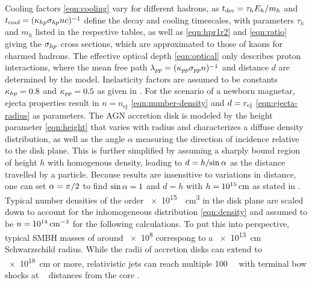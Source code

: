 Cooling factors \eqref{eqn:cooling} vary for different hadrons, as $t_\text{dec} \kern-0.5pt = \tau_h E_h / m_h$ and
$t_\text{cool} \kern-0.5pt = \cramped{(\kappa_{h \kern-0.1pt p} \sigma_{h \kern-0.1pt p} n c)^{-1}}$ define the decay and cooling timescales,
with parameters $\tau_h$ and $m_h$ listed in the respective tables, as well as \eqref{eqn:hpr1r2} and \eqref{eqn:ratio} giving the
$\sigma_{h \kern-0.1pt p}$ cross sections, which are approximated to those of kaons for charmed hadrons. The effective optical depth
\eqref{eqn:optical} only describes proton interactions, where the mean free path
$\lambda_{p \kern-0.1pt p} = \cramped{(\kappa_{p \kern-0.1pt p} \sigma_{p \kern-0.1pt p} n)^{-1}}$ and distance $d$ are determined by the
model. Inelasticity factors are assumed to be constants $\kappa_{h \kern-0.1pt p} = \num{0.8}$ and $\kappa_{p \kern-0.1pt p} = \num{0.5}$
as given in \cite{Carpio_2020}. For the scenario of a newborn magnetar, ejecta properties result in
$n = n_\text{ej}$ \eqref{eqn:number-density} and $d \kern+0.1pt = r_\text{ej}$ \eqref{eqn:ejecta-radius} as parameters. The AGN
accretion disk is modeled by the height parameter \eqref{eqn:height} that varies with radius and characterizes a diffuse density
distribution, as well as the angle $\alpha$ measuring the direction of incidence relative to the disk plane. This is further
simplified by assuming a sharply bound region of height $h$ with homogenous density, leading to $d = h / \kern-2.0pt \sin \alpha$
as the distance travelled by a particle. Because results are insensitive to variations in distance, one can set
$\alpha = \pi \kern+0.25pt / 2$ to find $\sin\alpha = \kern-0.1pt 1$ and $d = h$ with $h = \kern-0.5pt \smash{\qty{e15}{\centi\meter}}$
as stated in \cite{King_2008}. Typical number densities of the order \qty{e15}{\per\centi\meter\cubed} in the disk plane
\cite{Garcia_2013, Garcia_2014} are scaled down to account for the inhomogeneous distribution \eqref{eqn:density} and assumed to be
$n = \kern-0.5pt \smash{\qty{e14}{\per\centi\meter\cubed}}$ for the following calculations. To put this into perspective, typical
SMBH masses of around \qty{e8}{\solarmass} correspong to a \qty{e13}{\centi\meter} Schwarzschild radius. While the radii of accretion disks
can extend to \qty{e18}{\centi\meter} or more, relativistic jets can reach multiple \qty{100}{\kilo\parsec} with terminal bow shocks at
\unit{\mega\parsec} distances from the core \cite{Blandford_2019, King_2008, Murase_2023}.

\newpage

